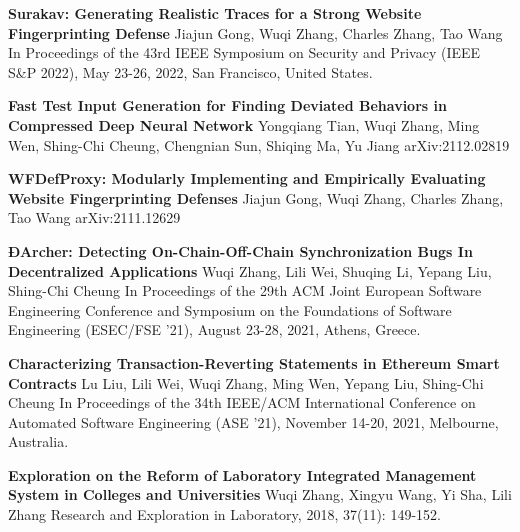 %
%
%


\begin{scholarship}
	{\textbf{Surakav: Generating Realistic Traces for a Strong Website Fingerprinting Defense}}
	{Jiajun Gong, Wuqi Zhang, Charles Zhang, Tao Wang}
	\scholarshipentry{}
	{In Proceedings of the 43rd IEEE Symposium on Security and Privacy (IEEE S\&P 2022), May 23-26, 2022, San Francisco, United States.}

	{\textbf{Fast Test Input Generation for Finding Deviated Behaviors in Compressed Deep Neural Network}}
	{Yongqiang Tian, Wuqi Zhang, Ming Wen, Shing-Chi Cheung, Chengnian Sun, Shiqing Ma, Yu Jiang}
	\scholarshipentry{}
	{arXiv:2112.02819}

	{\textbf{WFDefProxy: Modularly Implementing and Empirically Evaluating Website Fingerprinting Defenses}}
	{Jiajun Gong, Wuqi Zhang, Charles Zhang, Tao Wang}
	\scholarshipentry{}
	{arXiv:2111.12629}

	{\textbf{ÐArcher: Detecting On-Chain-Off-Chain Synchronization Bugs In Decentralized Applications}}
	{Wuqi Zhang, Lili Wei, Shuqing Li, Yepang Liu, Shing-Chi Cheung}
	\scholarshipentry{}
	{In Proceedings of the 29th ACM Joint European Software Engineering Conference and Symposium on the Foundations of Software Engineering (ESEC/FSE '21), August 23-28, 2021, Athens, Greece.}

	{\textbf{Characterizing Transaction-Reverting Statements in Ethereum Smart Contracts}}
	{Lu Liu, Lili Wei, Wuqi Zhang, Ming Wen, Yepang Liu, Shing-Chi Cheung}
	\scholarshipentry{}
	{In Proceedings of the 34th IEEE/ACM International Conference on Automated Software Engineering (ASE ’21), November 14-20, 2021, Melbourne, Australia.}

	{\textbf{Exploration on the Reform of Laboratory Integrated Management System in Colleges and Universities}}
	{Wuqi Zhang, Xingyu Wang, Yi Sha, Lili Zhang}
	\scholarshipentry{}
	{Research and Exploration in Laboratory, 2018, 37(11): 149-152.}
\end{scholarship}